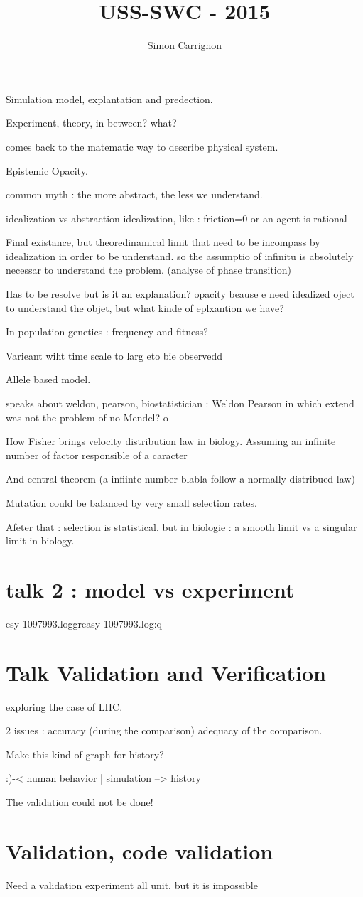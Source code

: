 \documentclass[a4paper]{article}
\title{USS-SWC - 2015}
\author{Simon Carrignon}
\begin{document}
Simulation model, explantation and predection.

Experiment, theory, in between? what?

comes back to the matematic way to describe physical system.

Epistemic Opacity.


common myth : the more abstract, the less we understand.

idealization vs abstraction
idealization, like : friction=0 or an agent is rational

Final existance, but theoredinamical limit that need to be incompass by idealization in order to be understand.
so the assumptio of infinitu is absolutely necessar to understand the problem. 
(analyse of phase transition)



Has to be resolve
but is it an explanation?
opacity beause e need idealized oject to understand the objet, but what kinde of eplxantion we have?

In population genetics : frequency and fitness?

Varieant wiht time scale to larg eto bie observedd

Allele based model.


speaks about weldon, pearson, biostatistician : Weldon Pearson in which extend was not the problem of no Mendel?
o

How Fisher brings velocity distribution law in biology. Assuming an infinite number of factor responsible of a caracter

And central theorem (a infiinte number blabla follow a normally distribued law)


Mutation could be balanced by very small selection rates.


Afeter that : selection is statistical. 
but in biologie : a smooth limit vs a singular limit in biology.


\section{talk 2 : model vs experiment}
esy-1097993.loggreasy-1097993.log:q


\section{Talk Validation and Verification}
exploring the case of LHC. 

2 issues : 
accuracy (during the comparison)
adequacy of the comparison.


Make this kind of graph for history?


:)-< human behavior    | simulation
--> history


The validation could not be done!



\section{Validation, code validation}

Need a validation experiment
all unit, but it is impossible	
\end{document}
